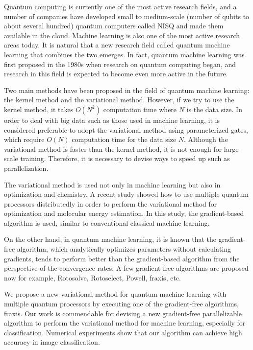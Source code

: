 \begin{eabstract}
\par Quantum computing is currently one of the most active research fields, and a number of companies have developed small to medium-scale (number of qubits to about several hundred) quantum computers called NISQ and made them available in the cloud. Machine learning is also one of the most active research areas today. It is natural that a new research field called quantum machine learning that combines the two emerges. In fact, quantum machine learning was first proposed in the 1980s when research on quantum computing began, and research in this field is expected to become even more active in the future.
\par Two main methods have been proposed in the field of quantum machine learning: the kernel method and the variational method. However, if we try to use the kernel method, it takes $O(N^2)$ computation time where $N$ is the data size. In order to deal with big data such as those used in machine learning, it is considered preferable to adopt the variational method using parameterized gates, which require $O(N)$ computation time for the data size $N$. Although the variational method is faster than the kernel method, it is not enough for large-scale training. Therefore, it is necessary to devise ways to speed up such as parallelization.
\par The variational method is used not only in machine learning but also in optimization and chemistry. A recent study showed how to use multiple quantum processors distributedly in order to perform the variational method for optimization and molecular energy estimation. In this study, the gradient-based algorithm is used, similar to conventional classical machine learning.
\par On the other hand, in quantum machine learning, it is known that the gradient-free algorithm, which analytically optimizes parameters without calculating gradients, tends to perform better than the gradient-based algorithm from the perspective of the convergence rates. A few gradient-free algorithms are proposed now for example, Rotosolve, Rotoselect, Powell, fraxis, etc.
\par We propose a new variational method for quantum machine learning with multiple quantum processors by executing one of the gradient-free algorithms, fraxis. Our work is commendable for devising a new gradient-free parallelizable algorithm to perform the variational method for machine learning, especially for classification. Numerical experiments show that our algorithm can achieve high accuracy in image classification. 
\end{eabstract}